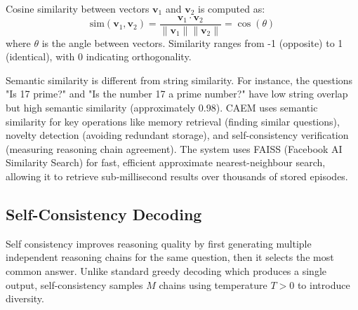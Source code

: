 Cosine similarity between vectors $\mathbf{v}_1$ and $\mathbf{v}_2$ is computed as:
\begin{equation}
\text{sim}(\mathbf{v}_1, \mathbf{v}_2) = \frac{\mathbf{v}_1 \cdot \mathbf{v}_2}{\|\mathbf{v}_1\| \|\mathbf{v}_2\|} = \cos(\theta)
\end{equation}
where $\theta$ is the angle between vectors. Similarity ranges from -1 (opposite) to 1 (identical), with 0 indicating orthogonality.

Semantic similarity is different from string similarity. For instance, the questions "Is 17 prime?" and "Is the number 17 a prime number?" have low string overlap but high semantic similarity (approximately 0.98). CAEM uses semantic similarity for key operations like memory retrieval (finding similar questions), novelty detection (avoiding redundant storage), and self-consistency verification (measuring reasoning chain agreement). The system uses FAISS (Facebook AI Similarity Search) \cite{8733051} for fast, efficient approximate nearest-neighbour search, allowing it to retrieve sub-millisecond results over thousands of stored episodes.

\subsection{Self-Consistency Decoding}

Self consistency \cite{wang2023selfconsistency} improves reasoning quality by first generating multiple independent reasoning chains for the same question, then it selects the most common answer. Unlike standard greedy decoding which produces a single output, self-consistency samples $M$ chains using temperature $T > 0$ to introduce diversity.

